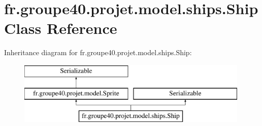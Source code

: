 \hypertarget{classfr_1_1groupe40_1_1projet_1_1model_1_1ships_1_1_ship}{}\section{fr.\+groupe40.\+projet.\+model.\+ships.\+Ship Class Reference}
\label{classfr_1_1groupe40_1_1projet_1_1model_1_1ships_1_1_ship}
Inheritance diagram for fr.\+groupe40.\+projet.\+model.\+ships.\+Ship\+:\begin{figure}[H]
\begin{center}
\leavevmode
\includegraphics[height=3.000000cm]{classfr_1_1groupe40_1_1projet_1_1model_1_1ships_1_1_ship}
\end{center}
\end{figure}
